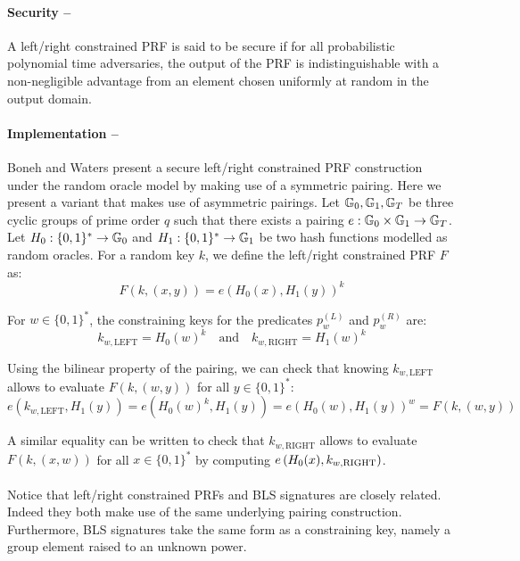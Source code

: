 \paragraph{Security -- } A left/right constrained PRF is said to be secure if for all probabilistic polynomial time adversaries, the output of the PRF is indistinguishable with a non-negligible advantage from an element chosen uniformly at random in the output domain.

\paragraph{Implementation --} \label{leftright} Boneh and Waters \cite{LRPRF} present a secure left/right constrained PRF construction under the random oracle model by making use of a symmetric pairing. Here we present a variant that makes use of asymmetric pairings. Let $\mathbb{G}_0, \mathbb{G}_1, \mathbb{G}_T$ be three cyclic groups of prime order $q$ such that there exists a pairing $e : \mathbb{G}_0 \times \mathbb{G}_1 \rightarrow \mathbb{G}_T$. Let $H_0: \{0,1\}^* \rightarrow \mathbb{G}_0$ and $H_1: \{0,1\}^* \rightarrow \mathbb{G}_1$ be two hash functions modelled as random oracles. For a random key $k$, we define the left/right constrained PRF $F$ as:
\begin{equation}
	F(k, (x,y)) = e(H_0(x), H_1(y))^k
\end{equation}

For $w \in \{0,1\}^*$, the constraining keys for the predicates $p_w^{(L)}$ and  $p_w^{(R)}$ are:
\begin{equation}
\label{eq:constrkeys}
	k_{w,\mathrm{LEFT}} = H_0(w)^k \quad \mathrm{and} \quad k_{w,\mathrm{RIGHT}} = H_1(w)^k
\end{equation}

Using the bilinear property of the pairing, we can check that knowing $k_{w,\mathrm{LEFT}}$ allows to evaluate $F(k, (w,y))$ for all $y \in \{0,1\}^*$:
\begin{equation}
	e(k_{w,\mathrm{LEFT}}, H_1(y)) = e(H_0(w)^k, H_1(y)) = e(H_0(w), H_1(y))^w = F(k, (w,y))
\end{equation}

\noindent A similar equality can be written to check that $k_{w,\mathrm{RIGHT}}$ allows to evaluate $F(k, (x,w))$ for all $x \in \{0,1\}^*$ by computing $e\left(H_0(x), k_{w,\mathrm{RIGHT}} \right)$.


\paragraph{} Notice that left/right constrained PRFs and BLS signatures are closely related. Indeed they both make use of the same underlying pairing construction. Furthermore, BLS signatures take the same form as a constraining key, namely a group element raised to an unknown power.








